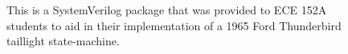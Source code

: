 
\begin{figure}[t]
    \centering
    \small
    \inputminted[frame=single]{systemverilog}{media/code/ece152a_pkg.sv}
    \caption{This is a SystemVerilog package that was provided to ECE 152A students to aid in their implementation of a 1965 Ford Thunderbird taillight state-machine.}
    \label{fig:ece152a_pkg}
\end{figure}
